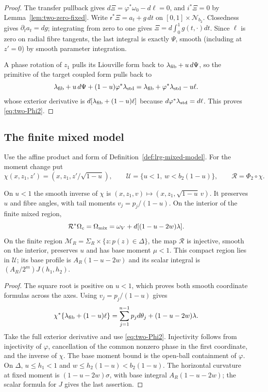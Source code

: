 \begin{proof}
The transfer pullback gives $d\Xi=\varphi^*\omega_0-d\ell=0$, and $i^*\Xi=0$ by Lemma~\ref{lem:two-zero-fixed}.
Write $\mathsf r^*\Xi=a_t+g\,dt$ on $[0,1]\times\mathcal N_{b_2}$. Closedness gives $\partial_ta_t=dg$; integrating
from zero to one gives $\Xi=d\int_0^1g(t,\cdot)dt$. Since $\ell$ is zero on radial fibre tangents, the last integral
is exactly $\Psi$, smooth (including at $z'=0$) by smooth parameter integration.

A phase rotation of $z_1$ pulls its Liouville form back to $\lambda_{\rm fib}+u\,d\Psi$, so the primitive of the
target coupled form pulls back to
\[
 \lambda_{\rm fib}+u\,d\Psi+(1-u)\varphi^*\lambda_{\rm std}
 =\lambda_{\rm fib}+\varphi^*\lambda_{\rm std}-u\ell.
\]
whose exterior derivative is $d[\lambda_{\rm fib}+(1-u)\ell]$ because $d\varphi^*\lambda_{\rm std}=d\ell$. This proves
\eqref{eq:two-Phi2}.
\end{proof}

\subsection{The finite mixed model}\label{sec:two-mixed}

Use the affine product and form of Definition~\ref{def:lrg-mixed-model}. For the moment change put
\[
 \chi(x,z_1,z')=(x,z_1,z'/\sqrt{1-u}),\qquad
 \mathcal U=\{u<1,\ w<b_2(1-u)\},\qquad \mathcal R=\Phi_2\circ\chi.
\]

\begin{lemma}\label{lem:two-mixed}
On $u<1$ the smooth inverse of $\chi$ is $(x,z_1,v)\mapsto(x,z_1,\sqrt{1-u}\,v)$. It preserves $u$ and fibre angles, with tail moments $v_j=p_j/(1-u)$. On the interior of the finite mixed region,
\[
 \mathcal R^*\Omega_c=\Omega_{\rm mix}=\omega_V+d[(1-u-2w)\lambda].
\]
On the finite region $\mathcal M_R=\Sigma_R\times\{z:p(z)\in\Delta\}$, the map $\mathcal R$ is injective, smooth on the
interior, preserves $u$ and has base moment $\mu<1$. This compact region lies in $\mathcal U$; its base profile is
$A_R(1-u-2w)$ and its scalar integral is $(A_R/2^m)J(h_1,h_2)$.
\end{lemma}

\begin{proof}
The square root is positive on $u<1$, which proves both smooth coordinate formulas across the axes. Using
$v_j=p_j/(1-u)$ gives
\[
 \chi^*\{\lambda_{\rm fib}+(1-u)\ell\}
 =\sum_{j=1}^{n-1}p_jd\theta_j+(1-u-2w)\lambda.
\]
Take the full exterior derivative and use \eqref{eq:two-Phi2}. Injectivity follows from injectivity of $\varphi$,
cancellation of the common nonzero phase in the first coordinate, and the inverse of $\chi$. The base moment bound is
the open-ball containment of $\varphi$. On $\Delta$, $u\le h_1<1$ and $w\le h_2(1-u)<b_2(1-u)$. The horizontal
curvature at fixed moment is $(1-u-2w)\sigma$, with base integral $A_R(1-u-2w)$; the scalar formula for $J$ gives the
last assertion.
\end{proof}

